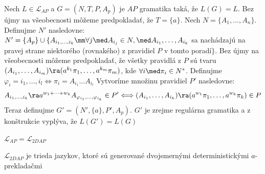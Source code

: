 \begin{dokaz}
Nech $L\in\mathcal{L}_{AP}$ a $G=(N,T,P,A_p)$ je $AP$ gramatika
taká, že $L(G)=L$. Bez újmy na všeobecnosti môžeme predpokladať,
že $T=\{a\}$. Nech \mbox{$N=\{A_1,\dots,A_n\}$}. Definujme $N'$
nasledovne: $N'=\{A_p\}\cup\{A_{i_1,\dots,i_k}\mm\forall j\med
A_{i_j}\in N,\med A_{i_1},\dots,A_{i_k}$ sa nachádzajú na pravej
strane niektorého (rovnakého) z pravidiel $P$ v tomto poradí$\}$.
Bez újmy na všeobecnosti môžeme pred\-pokla\-dať, že všetky
pravidlá z $P$ sú tvaru
$(A_{i_1},\dots,A_{i_m})\ra(a^{k_1}\pi_1,\dots,a^{k_m}\pi_m)$, kde
$\forall i\med \pi_i\in N^*$. Definujme
$\varphi_i=i_1,\dots,i_l\Longleftrightarrow\pi_i=A_{i_1}\dots
A_{i_l}$ Vytvoríme množinu pravidiel $P'$ nasledovne:
\[
A_{i_1,\dots,i_k}\ra
a^{w_1+\cdots+w_k}A_{\varphi_{i_1},\dots,\varphi_{i_k}}\in
P'\Longleftrightarrow
(A_{i_1},\dots,A_{i_k})\ra(a^{w_1}\pi_1,\dots,a^{w_k}\pi_k)\in P
\]
Teraz definujme $G'=(N',\{a\},P',A_p)$. $G'$ je zrejme regulárna
gramatika a z konštrukcie vyplýva, že $L(G')=L(G)$
\end{dokaz}

\begin{veta}
$\mathcal{L}_{AP}=\mathcal{L}_{2DAP}$
\end{veta}

\begin{poznamka}
$\mathcal{L}_{2DAP}$ je trieda jazykov, ktoré sú generované
dvojsmernými determi\-nis\-tic\-ký\-mi $a$-prek\-la\-dač\-mi
\end{poznamka}
